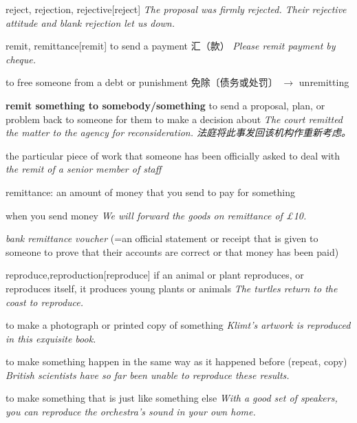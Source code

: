 \begin{DefWord}{reject, rejection, rejective}[reject]
    \textit{The proposal was firmly rejected. Their rejective attitude and blank rejection let us down.}
\end{DefWord}

\begin{DefWord}{remit, remittance}[remit]
    to send a payment 汇（款）
    \textit{Please remit payment by cheque.}

    to free someone from a debt or punishment 免除〔债务或处罚〕 $\rightarrow$  unremitting

    \textbf{remit something to somebody/something}
    to send a proposal, plan, or problem back to someone for them to make a decision about
    \textit{The court remitted the matter to the agency for reconsideration. 法庭将此事发回该机构作重新考虑。 }

    the particular piece of work that someone has been officially asked to deal with
    \textit{the remit of a senior member of staff}

    remittance: an amount of money that you send to pay for something

    when you send money
    \textit{We will forward the goods on remittance of £10.}

    \textit{bank remittance voucher} (=an official statement or receipt that is given to someone to prove that their accounts are correct or that money has been paid)
\end{DefWord}


\begin{DefWord}{reproduce,reproduction}[reproduce]
    if an animal or plant reproduces, or reproduces itself, it produces young plants or animals
    \textit{The turtles return to the coast to reproduce.}

    to make a photograph or printed copy of something
    \textit{Klimt's artwork is reproduced in this exquisite book.}

    to make something happen in the same way as it happened before (repeat, copy)
    \textit{British scientists have so far been unable to reproduce these results.}

    to make something that is just like something else
    \textit{With a good set of speakers, you can reproduce the orchestra's sound in your own home.}
\end{DefWord}

